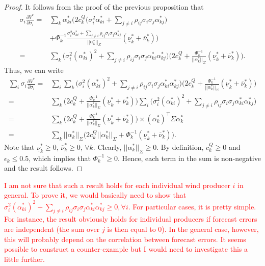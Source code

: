 \documentclass{article}
\begin{document}
\begin{proof}
It follows from the proof of the previous proposition that
\begin{align*}
\sigma_i \frac{\partial V^*}{\partial \sigma_i} =& \sum_k\alpha_{ki}^*\Big(2c_k^Q\big(\sigma_i^2 \alpha_{ki}^* + \sum_{j \ne i} \rho_{ij} \sigma_i \sigma_j\alpha_{kj}^*\big)\\
&+ \Phi_k^{-1} \frac{\sigma_i^2 \alpha_{ki}^* + \sum_{j \ne i} \rho_{ij} \sigma_i \sigma_j \alpha_{kj}^*}{||\alpha_k^*||_{\Sigma}}(\underline{\nu}_k^* + \overline{\nu}_k^*)\Big)\\
=&  \sum_k\Big(\sigma_i^2 (\alpha_{ki}^*)^2 + \sum_{j \ne i} \rho_{ij} \sigma_i \sigma_j\alpha_{ki}^* \alpha_{kj}^*\Big)\Big(2c_k^Q + \frac{\Phi_k^{-1}}{||\alpha_k^*||_{\Sigma}}(\underline{\nu}_k^* + \overline{\nu}_k^*)\Big).
\end{align*}
Thus, we can write
\begin{align*}
\sum_i \sigma_i \frac{\partial V^*}{\partial \sigma_i} =& \sum_i \sum_k \Big(\sigma_i^2 (\alpha_{ki}^*)^2 + \sum_{j \ne i} \rho_{ij} \sigma_i \sigma_j\alpha_{ki}^* \alpha_{kj}^*\Big) \Big(2c_k^Q + \frac{\Phi_k^{-1}}{||\alpha_k^*||_{\Sigma}}(\underline{\nu}_k^* + \overline{\nu}_k^*)\Big)\\
=& \sum_k \Big(2c_k^Q + \frac{\Phi_k^{-1}}{||\alpha_k^*||_{\Sigma}}(\underline{\nu}_k^* + \overline{\nu}_k^*)\Big) \sum_i \Big(\sigma_i^2 (\alpha_{ki}^*)^2 + \sum_{j \ne i} \rho_{ij} \sigma_i \sigma_j\alpha_{ki}^* \alpha_{kj}^*\Big)\\
=& \sum_k \Big(2c_k^Q + \frac{\Phi_k^{-1}}{||\alpha_k^*||_{\Sigma}}(\underline{\nu}_k^* + \overline{\nu}_k^*)\Big) \times(\alpha_k^*)^\top \Sigma \alpha_k^*\\
=& \sum_k ||\alpha_k^*||_{\Sigma} \Big(2c_k^Q ||\alpha_k^*||_{\Sigma} + \Phi_k^{-1} (\underline{\nu}_k^* + \overline{\nu}_k^*)\Big).
\end{align*}
Note that $\underline{\nu}_k^* \ge 0$, $\overline{\nu}_k^* \ge 0$, $\forall k$. Clearly, $||\alpha_k^*||_{\Sigma} \ge 0$. By definition, $c_k^Q \ge 0$ and $\epsilon_k \le 0.5$, which implies that $\Phi^{-1}_k \ge 0$. Hence, each term in the sum is non-negative and the result follows.
\end{proof}

\textcolor{red}{I am not sure that such a result holds for each individual wind producer $i$ in general. To prove it, we would basically need to show that $\sigma_i^2 (\alpha_{ki}^*)^2 + \sum_{j \ne i} \rho_{ij} \sigma_i \sigma_j \alpha_{ki}^* \alpha_{kj}^* \ge 0, \forall i$. For particular cases, it is pretty simple. For instance, the result obviously holds for individual producers if forecast errors are independent (the sum over $j$ is then equal to 0). In the general case, however, this will probably depend on the correlation between forecast errors. It seems possible to construct a counter-example but I would need to investigate this a little further.}
\end{document}
